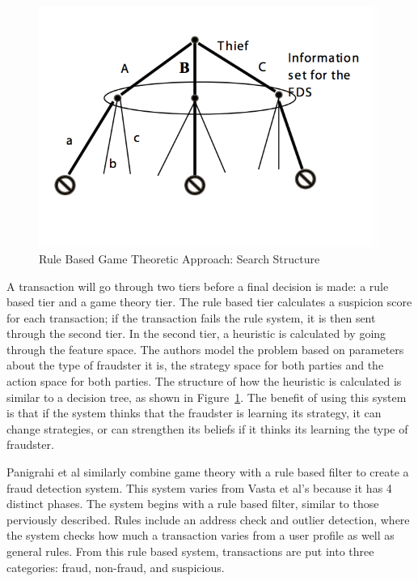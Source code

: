 \documentclass[midd]{thesis}
\begin{document}
\begin{figure} \centering
  \includegraphics[scale=1]{gametheory.png}
  \caption{Rule Based Game Theoretic Approach: Search Structure}
  \label{fig:gametheory1}
\end{figure}

A transaction will go through two tiers before a final decision is made: a rule based tier and a game theory tier. The rule based tier calculates a suspicion score for each transaction; if the transaction fails the rule system, it is then sent through the second tier. In the second tier, a heuristic is calculated by going through the feature space. The authors model the problem based on parameters about the type of fraudster it is, the strategy space for both parties and the action space for both parties. The structure of how the heuristic is calculated is similar to a decision tree, as shown in Figure~\ref{fig:gametheory1}. The benefit of using this system is that if the system thinks that the fraudster is learning its strategy, it can change strategies, or can strengthen its beliefs if it thinks its learning the type of fraudster.    



Panigrahi et al similarly combine game theory with a rule based filter to create a fraud detection system. This system varies from Vasta et al's because it has 4 distinct phases. The system begins with a rule based filter, similar to those perviously described. Rules include an address check and outlier detection, where the system checks how much a transaction varies from a user profile as well as general rules. From this rule based system, transactions are put into three categories: fraud, non-fraud, and suspicious. 
\end{document}
